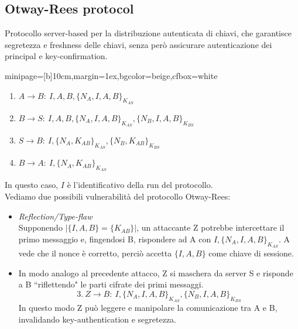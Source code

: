 \documentclass[a4paper, 11pt, notitlepage, fleqn]{report}
\newcommand{\fromto}[2]{#1\rightarrow #2\!:\ }
\newenvironment{colbox}[2]%
{%
	\par\noindent\hspace{10pt}
	\begin{adjustbox}{minipage=[b]{#2},margin=1ex,bgcolor=#1,cfbox=white}
}{%
	\end{adjustbox}\newline%
}
\begin{document}
\subsection{Otway-Rees protocol}
Protocollo server-based per la distribuzione autenticata di chiavi, che garantisce segretezza e freshness delle chiavi, senza però assicurare autenticazione dei principal e key-confirmation.
\begin{colbox}{beige}{10cm}
	\begin{enumerate}
		\item $\fromto{A}{B}I,A,B,\{N_A,I,A,B\}_{K_{AS}}$
		\item $\fromto{B}{S}I,A,B,\{N_A,I,A,B\}_{K_{AS}},\{N_B,I,A,B\}_{K_{BS}}$
		\item $\fromto{S}{B}I,\{N_A,K_{AB}\}_{K_{AS}},\{N_B,K_{AB}\}_{K_{BS}}$
		\item $\fromto{B}{A}I,\{N_A,K_{AB}\}_{K_{AS}}$
	\end{enumerate}
\end{colbox}
In questo caso, $I$ è l'identificativo della run del protocollo.\\
Vediamo due possibili vulnerabilità del protocollo Otway-Rees:
\begin{itemize}
	\item \emph{Reflection/Type-flaw}\\
	Supponendo $|\{I,A,B\}=\{K_{AB}\}|$, un attaccante Z potrebbe intercettare il primo messaggio e, fingendosi B, rispondere ad A con $I,\{N_A,I,A,B\}_{K_{AS}}$. A vede che il nonce è corretto, perciò accetta $\{I,A,B\}$ come chiave di sessione.
	\item In modo analogo al precedente attacco, Z si maschera da server S e risponde a B ``riflettendo" le parti cifrate dei primi messaggi.
	\begin{equation*}
		3.\ \fromto{Z}{B}I,\{N_A,I,A,B\}_{K_{AS}},\{N_B,I,A,B\}_{K_{BS}}
	\end{equation*}
	In questo modo Z può leggere e manipolare la comunicazione tra A e B, invalidando key-authentication e segretezza.
\end{itemize}
\end{document}
